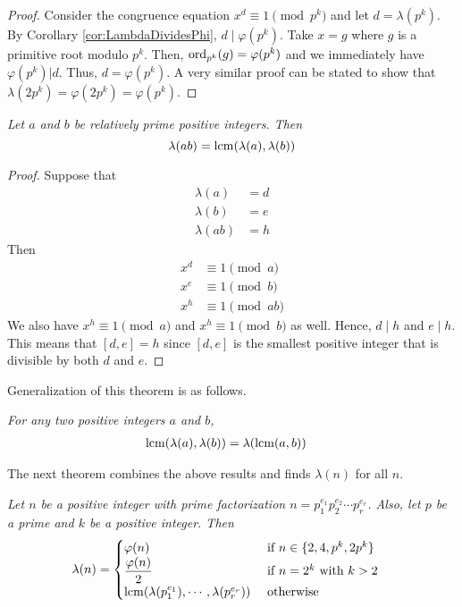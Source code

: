 \documentclass{subfile}
\begin{document}
	\begin{proof}
		Consider the congruence equation $x^d\equiv1\pmod{p^k}$ and let $d=\lambda(p^k)$. By Corollary \ref{cor:LambdaDividesPhi}, $d \mid \varphi(p^k)$. Take $x=g$ where $g$ is a primitive root modulo $p^k$. Then, $\operatorname{ord}_{p^k}(g)=\varphi(p^k)$ and we immediately have $\varphi(p^k)|d$. Thus, $d=\varphi(p^k)$. A very similar proof can be stated to show that $\lambda (2p^k)=\varphi (2p^k) = \varphi(p^k)$.
	\end{proof}

	\begin{theorem}\slshape
		Let $a$ and $b$ be relatively prime positive integers. Then
		 \[\lambda(ab)=\operatorname{lcm}(\lambda(a),\lambda(b))\]
	\end{theorem}

	\begin{proof}
		Suppose that
			\begin{align*}
				\lambda(a)
					& =d\\
				\lambda(b)
					& =e\\
				\lambda(ab)
					& =h
			\end{align*}
		Then
			\begin{align*}
				x^d
					& \equiv1\pmod a\\
				x^e
					& \equiv1\pmod b\\
				x^{h}
					& \equiv1\pmod{ab}
			\end{align*}
		We also have $x^h\equiv1\pmod a$ and $x^h\equiv1\pmod b$ as well. Hence, $d \mid h$ and $e \mid h$. This means that $[d,e]=h$ since $[d,e]$ is the smallest positive integer that is divisible by both $d$ and $e$.
	\end{proof}
	Generalization of this theorem is as follows.
	\begin{theorem}\slshape
		For any two positive integers $a$ and $b$,
		\begin{align*}
		\operatorname{lcm}(\lambda(a),\lambda(b)) & = \lambda(\operatorname{lcm}(a,b))
		\end{align*}
	\end{theorem}
	The next theorem combines the above results and finds $\lambda(n)$ for all $n$.
	\begin{theorem}\slshape\label{thm:CarmichaelFormula}
		Let $n$ be a positive integer with prime factorization $n=p_1^{e_1}p_2^{e_2}\cdots p_r^{e_r}$. Also, let $p$ be a prime and $k$ be a positive integer. Then
		\begin{align*}
			\lambda(n) & =
				\begin{cases}
					\varphi(n)& \mbox{ if } n\in\{2,4,p^k,2p^k\}\\
					\dfrac{\varphi(n)}{2}& \mbox{ if }n=2^k\mbox{ with }k>2\\
					\operatorname{lcm}(\lambda(p_1^{e_1}),\cdots,\lambda(p_r^{e_r}))& \mbox{ otherwise}
				\end{cases}
		\end{align*}
	\end{theorem}
\end{document}
